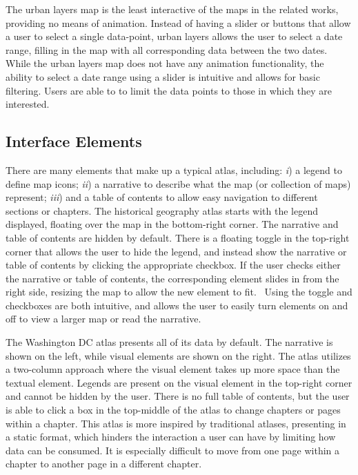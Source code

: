 \documentclass[11pt, final, conference, twocolumn]{IEEEtran}
\begin{document}
The urban layers map is the least interactive of the maps in the related works, providing no means of animation. Instead of having a slider or buttons that allow a user to select a single data-point, urban layers allows the user to select a date range, filling in the map with all corresponding data between the two dates.~\cite{urban-layers-2014} While the urban layers map does not have any animation functionality, the ability to select a date range using a slider is intuitive and allows for basic filtering. Users are able to to limit the data points to those in which they are interested.

\subsection{Interface Elements}
There are many elements that make up a typical atlas, including: {\it i}) a legend to define map icons; {\it ii}) a narrative to describe what the map (or collection of maps) represent; {\it iii}) and a table of contents to allow easy navigation to different sections or chapters. The historical geography atlas starts with the legend displayed, floating over the map in the bottom-right corner. The narrative and table of contents are hidden by default. There is a floating toggle in the top-right corner that allows the user to hide the legend, and instead show the narrative or table of contents by clicking the appropriate checkbox. If the user checks either the narrative or table of contents, the corresponding element slides in from the right side, resizing the map to allow the new element to fit.~\cite{us-historical-atlas-2014} Using the toggle and checkboxes are both intuitive, and allows the user to easily turn elements on and off to view a larger map or read the narrative.

The Washington DC atlas presents all of its data by default.  The narrative is shown on the left, while visual elements are shown on the right.  The atlas utilizes a two-column approach where the visual element takes up more space than the textual element. Legends are present on the visual element in the top-right corner and cannot be hidden by the user. There is no full table of contents, but the user is able to click a box in the top-middle of the atlas to change chapters or pages within a chapter. This atlas is more inspired by traditional atlases, presenting in a static format, which hinders the interaction a user can have by limiting how data can be consumed.  It is especially difficult to move from one page within a chapter to another page in a different chapter.
\end{document}
